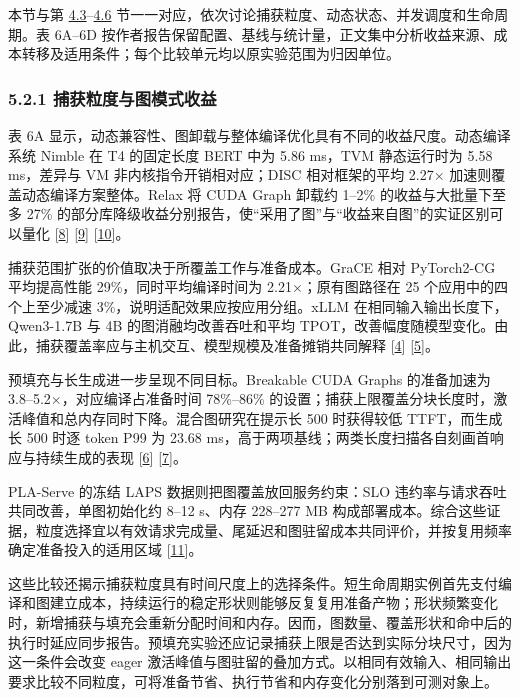 \documentclass[UTF8,10.5pt,fontset=windows]{ctexart}
\begin{document}
本节与第
\protect\hyperlink{section-4-3}{4.3}--\protect\hyperlink{section-4-6}{4.6}
节一一对应，依次讨论捕获粒度、动态状态、并发调度和生命周期。表 6A--6D
按作者报告保留配置、基线与统计量，正文集中分析收益来源、成本转移及适用条件；每个比较单元均以原实验范围为归因单位。

\hypertarget{section-5-2-1}{%
\subsubsection{5.2.1 捕获粒度与图模式收益}\label{section-5-2-1}}

表 6A
显示，动态兼容性、图卸载与整体编译优化具有不同的收益尺度。动态编译系统
Nimble 在 T4 的固定长度 BERT 中为 5.86 ms，TVM 静态运行时为 5.58
ms，差异与 VM 非内核指令开销相对应；DISC 相对框架的平均 2.27\(\times\)
加速则覆盖动态编译方案整体。Relax 将 CUDA Graph 卸载约 1--2\%
的收益与大批量下至多 27\%
的部分库降级收益分别报告，使``采用了图''与``收益来自图''的实证区别可以量化
{[}\protect\hyperlink{ref-shen2021nimble}{8}{]}
{[}\protect\hyperlink{ref-zhu2021disc}{9}{]}
{[}\protect\hyperlink{ref-lai2025relax}{10}{]}。

捕获范围扩张的价值取决于所覆盖工作与准备成本。GraCE 相对 PyTorch2-CG
平均提高性能 29\%，同时平均编译时间为 2.21\(\times\)；原有图路径在 25
个应用中的四个上至少减速 3\%，说明适配效果应按应用分组。xLLM
在相同输入输出长度下，Qwen3-1.7B 与 4B 的图消融均改善吞吐和平均
TPOT，改善幅度随模型变化。由此，捕获覆盖率应与主机交互、模型规模及准备摊销共同解释
{[}\protect\hyperlink{ref-ghosh2026grace}{4}{]}
{[}\protect\hyperlink{ref-liu2025xllm}{5}{]}。

预填充与长生成进一步呈现不同目标。Breakable CUDA Graphs 的准备加速为
3.8--5.2\(\times\)，对应编译占准备时间 78\%--86\%
的设置；捕获上限覆盖分块长度时，激活峰值和总内存同时下降。混合图研究在提示长
500 时获得较低 TTFT，而生成长 500 时逐 token P99 为 23.68
ms，高于两项基线；两类长度扫描各自刻画首响应与持续生成的表现
{[}\protect\hyperlink{ref-lmsys2026breakable}{6}{]}
{[}\protect\hyperlink{ref-yadav2026hybridpreprint}{7}{]}。

PLA-Serve 的冻结 LAPS 数据则把图覆盖放回服务约束：SLO
违约率与请求吞吐共同改善，单图初始化约 8--12 s、内存 228--277 MB
构成部署成本。综合这些证据，粒度选择宜以有效请求完成量、尾延迟和图驻留成本共同评价，并按复用频率确定准备投入的适用区域
{[}\protect\hyperlink{ref-she2026plaserve}{11}{]}。

这些比较还揭示捕获粒度具有时间尺度上的选择条件。短生命周期实例首先支付编译和图建立成本，持续运行的稳定形状则能够反复复用准备产物；形状频繁变化时，新增捕获与填充会重新分配时间和内存。因而，图数量、覆盖形状和命中后的执行时延应同步报告。预填充实验还应记录捕获上限是否达到实际分块尺寸，因为这一条件会改变
eager
激活峰值与图驻留的叠加方式。以相同有效输入、相同输出要求比较不同粒度，可将准备节省、执行节省和内存变化分别落到可测对象上。
\end{document}
